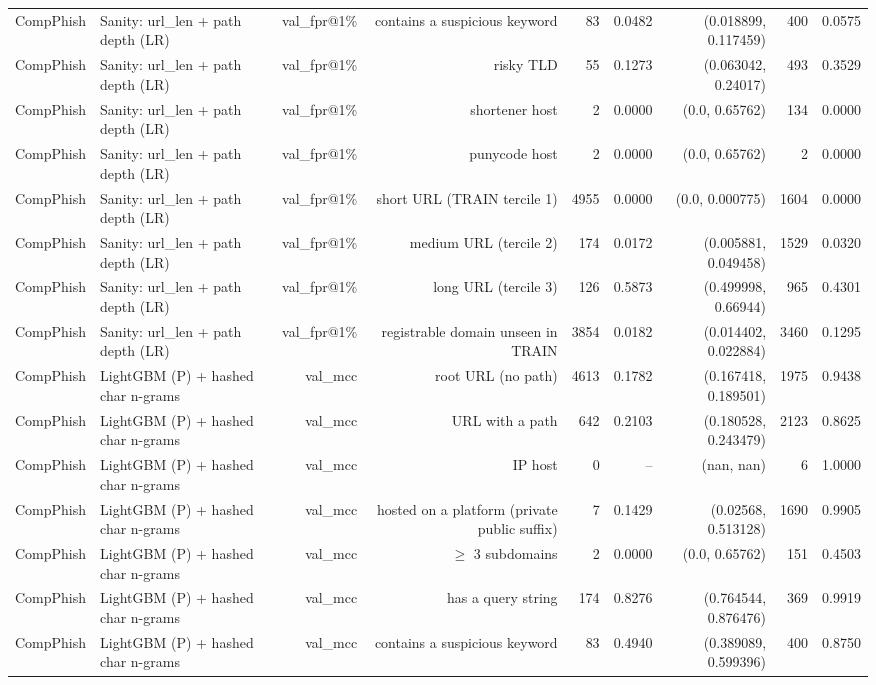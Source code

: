 \begin{table}[t]
\begin{tabular}{llrrrrrrr}
CompPhish & Sanity: url\_len + path depth (LR) & val\_fpr@1\% & contains a suspicious keyword & 83 & 0.0482 & (0.018899, 0.117459) & 400 & 0.0575 \\
CompPhish & Sanity: url\_len + path depth (LR) & val\_fpr@1\% & risky TLD & 55 & 0.1273 & (0.063042, 0.24017) & 493 & 0.3529 \\
CompPhish & Sanity: url\_len + path depth (LR) & val\_fpr@1\% & shortener host & 2 & 0.0000 & (0.0, 0.65762) & 134 & 0.0000 \\
CompPhish & Sanity: url\_len + path depth (LR) & val\_fpr@1\% & punycode host & 2 & 0.0000 & (0.0, 0.65762) & 2 & 0.0000 \\
CompPhish & Sanity: url\_len + path depth (LR) & val\_fpr@1\% & short URL (TRAIN tercile 1) & 4955 & 0.0000 & (0.0, 0.000775) & 1604 & 0.0000 \\
CompPhish & Sanity: url\_len + path depth (LR) & val\_fpr@1\% & medium URL (tercile 2) & 174 & 0.0172 & (0.005881, 0.049458) & 1529 & 0.0320 \\
CompPhish & Sanity: url\_len + path depth (LR) & val\_fpr@1\% & long URL (tercile 3) & 126 & 0.5873 & (0.499998, 0.66944) & 965 & 0.4301 \\
CompPhish & Sanity: url\_len + path depth (LR) & val\_fpr@1\% & registrable domain unseen in TRAIN & 3854 & 0.0182 & (0.014402, 0.022884) & 3460 & 0.1295 \\
CompPhish & LightGBM (P) + hashed char n-grams & val\_mcc & root URL (no path) & 4613 & 0.1782 & (0.167418, 0.189501) & 1975 & 0.9438 \\
CompPhish & LightGBM (P) + hashed char n-grams & val\_mcc & URL with a path & 642 & 0.2103 & (0.180528, 0.243479) & 2123 & 0.8625 \\
CompPhish & LightGBM (P) + hashed char n-grams & val\_mcc & IP host & 0 & -- & (nan, nan) & 6 & 1.0000 \\
CompPhish & LightGBM (P) + hashed char n-grams & val\_mcc & hosted on a platform (private public suffix) & 7 & 0.1429 & (0.02568, 0.513128) & 1690 & 0.9905 \\
CompPhish & LightGBM (P) + hashed char n-grams & val\_mcc & $\geq$ 3 subdomains & 2 & 0.0000 & (0.0, 0.65762) & 151 & 0.4503 \\
CompPhish & LightGBM (P) + hashed char n-grams & val\_mcc & has a query string & 174 & 0.8276 & (0.764544, 0.876476) & 369 & 0.9919 \\
CompPhish & LightGBM (P) + hashed char n-grams & val\_mcc & contains a suspicious keyword & 83 & 0.4940 & (0.389089, 0.599396) & 400 & 0.8750 \\

\end{tabular}
\end{table}
